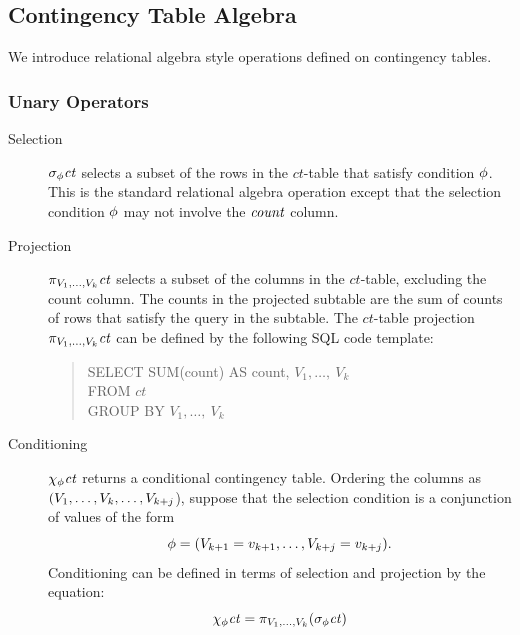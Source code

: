 \documentclass{sig-alternate-2013}
\newcommand{\ct}{\mathit{ct}}
\begin{document}

\subsection{Contingency Table Algebra} \label{sec:cta}
We introduce relational algebra style operations defined on contingency tables.



\subsubsection{Unary Operators} \label{sec:unary}
\begin{description}
\item[Selection] $\sigma_{\selectcond}  \ct$ selects a subset of the rows in the  $\ct$-table  that satisfy condition $\phi$. This is the standard relational algebra operation except that the selection condition $\phi$ may not involve the $\it{count}$ column.
\item[Projection]  %
$\project_{\V_{1},\ldots,\V_{k}} \ct$ selects a subset of the  columns in the  $\ct$-table, excluding the count column. 
The counts in the projected subtable are the sum of counts of rows that satisfy the query in the subtable. 
The  $\ct$-table projection  $\project_{\V_{1},\ldots,\V_{k}} \ct$ can be defined by the following SQL code template:
\begin{quote}
SELECT SUM(count) AS count, $V_{1}, \ldots,\ V_{k}$ \\
FROM $\ct$ \\
GROUP BY $V_{1}, \ldots,\ V_{k}$
\end{quote}
\item[Conditioning]  $\condition_{\selectcond}  \ct$ returns a conditional contingency table. Ordering the columns as $(V_{1},\ldots,V_{k}, \ldots,V_{k+j}$),  suppose that the selection condition is a conjunction of values of the form $$\phi = (V_{k+1} = v_{k+1},\ldots, V_{k+j} = v_{k+j}).$$  Conditioning can be defined in terms of selection and projection by the equation:
\begin{equation}
\condition_{\selectcond}  \ct = \project_{\V_{1},\ldots,\V_{k}} (\select_{\selectcond}  \ct) \nonumber
\end{equation}
\end{description}
\end{document}

